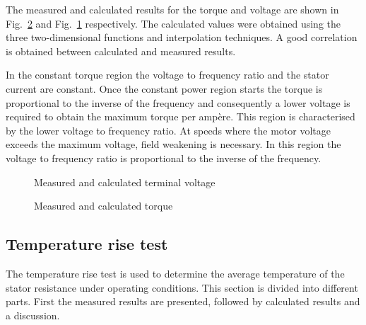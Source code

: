The measured and calculated results for the torque and voltage are shown in Fig.~\ref{fig:T_measured} and Fig.~\ref{fig:U1_measured} respectively. The calculated values were obtained using the three two-dimensional functions and interpolation techniques. A good correlation is obtained between calculated and measured results.

In the constant torque region the voltage to frequency ratio and the stator current are constant. Once the constant power region starts the torque is proportional to the inverse of the frequency and consequently a lower voltage is required to obtain the maximum torque per amp\`ere. This region is characterised by the lower voltage to frequency ratio. At speeds where the motor voltage exceeds the maximum
voltage, field weakening is necessary. In this region the voltage to frequency ratio is proportional to the inverse of the frequency.
\begin{figure}[htbp]
	\centering
		
	\caption{Measured and calculated terminal voltage}
	\label{fig:U1_measured}
\end{figure}

\begin{figure}
	\centering
		
	\caption{Measured and calculated torque}
	\label{fig:T_measured}
\end{figure}


\subsection{Temperature rise test}
The temperature rise test is used to determine the average temperature of the stator resistance under operating conditions. This section is divided into different parts. First the measured results are presented, followed by calculated results and a discussion.

